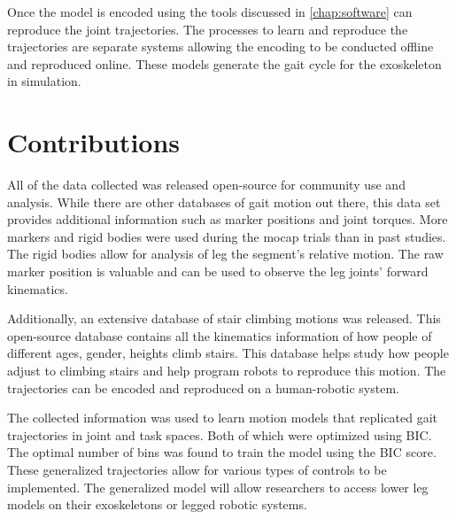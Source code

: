 Once the model is encoded using the tools discussed in \autoref{chap:software} can reproduce the joint trajectories. The processes to learn and reproduce the trajectories are separate systems allowing the encoding to be conducted offline and reproduced online. These models generate the gait cycle for the exoskeleton in simulation. 


\section{Contributions}

All of the data collected was released open-source for community use and analysis. While there are other databases of gait motion out there, this data set provides additional information such as marker positions and joint torques. More markers and rigid bodies were used during the mocap trials than in past studies. The rigid bodies allow for analysis of leg the segment's relative motion. The raw marker position is valuable and can be used to observe the leg joints' forward kinematics. 

Additionally, an extensive database of stair climbing motions was released. This open-source database contains all the kinematics information of how people of different ages, gender, heights climb stairs. This database helps study how people adjust to climbing stairs and help program robots to reproduce this motion. The trajectories can be encoded and reproduced on a human-robotic system. 

The collected information was used to learn motion models that replicated gait trajectories in joint and task spaces. Both of which were optimized using BIC. The optimal number of bins was found to train the model using the BIC score. These generalized trajectories allow for various types of controls to be implemented. The generalized model will allow researchers to access lower leg models on their exoskeletons or legged robotic systems. 